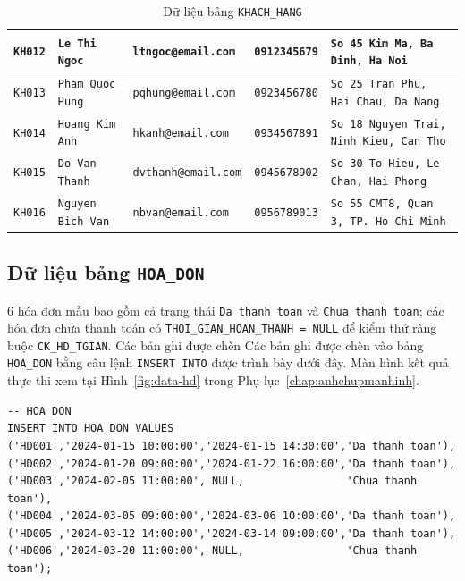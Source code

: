 \documentclass[11pt]{report}
\begin{document}
\begin{table}[H]
\begin{tabularx}{\textwidth}{|>{\scriptsize}l|>{\scriptsize}l|>{\scriptsize}l|>{\scriptsize}l|>{\raggedright\arraybackslash\scriptsize}X|}
        \texttt{KH012} & \texttt{Le Thi Ngoc}     & \texttt{ltngoc@email.com}   & \texttt{0912345679} & \texttt{So 45 Kim Ma, Ba Dinh, Ha Noi} \\ \hline
        \texttt{KH013} & \texttt{Pham Quoc Hung}  & \texttt{pqhung@email.com}   & \texttt{0923456780} & \texttt{So 25 Tran Phu, Hai Chau, Da Nang} \\ \hline
        \texttt{KH014} & \texttt{Hoang Kim Anh}   & \texttt{hkanh@email.com}    & \texttt{0934567891} & \texttt{So 18 Nguyen Trai, Ninh Kieu, Can Tho} \\ \hline
        \texttt{KH015} & \texttt{Do Van Thanh}    & \texttt{dvthanh@email.com}  & \texttt{0945678902} & \texttt{So 30 To Hieu, Le Chan, Hai Phong} \\ \hline
        \texttt{KH016} & \texttt{Nguyen Bich Van} & \texttt{nbvan@email.com}    & \texttt{0956789013} & \texttt{So 55 CMT8, Quan 3, TP. Ho Chi Minh} \\ \hline
    \end{tabularx}
    \caption{Dữ liệu bảng \texttt{KHACH\_HANG}}
    \label{tab:data_kh}
\end{table}


\subsection{Dữ liệu bảng \texttt{HOA\_DON}}

6 hóa đơn mẫu bao gồm cả trạng thái \texttt{Da thanh toan} và \texttt{Chua thanh toan}; các hóa đơn chưa thanh toán có \texttt{THOI\_GIAN\_HOAN\_THANH = NULL} để kiểm thử ràng buộc \texttt{CK\_HD\_TGIAN}. Các bản ghi được chèn Các bản ghi được chèn vào bảng \texttt{HOA\_DON} bằng câu lệnh \texttt{INSERT INTO} được trình bày dưới đây. Màn hình kết quả thực thi xem tại Hình~\ref{fig:data-hd} trong Phụ lục~\ref{chap:anhchupmanhinh}.

\begin{verbatim}
-- HOA_DON
INSERT INTO HOA_DON VALUES
('HD001','2024-01-15 10:00:00','2024-01-15 14:30:00','Da thanh toan'),
('HD002','2024-01-20 09:00:00','2024-01-22 16:00:00','Da thanh toan'),
('HD003','2024-02-05 11:00:00', NULL,                'Chua thanh toan'),
('HD004','2024-03-05 09:00:00','2024-03-06 10:00:00','Da thanh toan'),
('HD005','2024-03-12 14:00:00','2024-03-14 09:00:00','Da thanh toan'),
('HD006','2024-03-20 11:00:00', NULL,                'Chua thanh toan');    
\end{verbatim}
\end{document}
